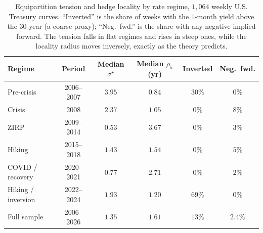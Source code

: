 \documentclass[]{interact}
\theoremstyle{plain}
\begin{document}
\begin{table}[h]\centering\small
\begin{tabular}{lccccc}
\hline
Regime & Period & Median $\sigma^\star$ & Median $\rho_5$ (yr) & Inverted & Neg.\ fwd.\\
\hline
Pre-crisis      & 2006--2007 & $3.95$ & $0.84$ & $30\%$ & $0\%$\\
Crisis          & 2008       & $2.37$ & $1.05$ & $0\%$  & $8\%$\\
ZIRP            & 2009--2014 & $0.53$ & $3.67$ & $0\%$  & $3\%$\\
Hiking          & 2015--2018 & $1.43$ & $1.54$ & $0\%$  & $5\%$\\
COVID / recovery& 2020--2021 & $0.77$ & $2.71$ & $0\%$  & $2\%$\\
Hiking / inversion & 2022--2024 & $1.93$ & $1.20$ & $69\%$ & $0\%$\\
\hline
Full sample     & 2006--2026 & $1.35$ & $1.61$ & $13\%$ & $2.4\%$\\
\hline
\end{tabular}
\caption{Equipartition tension and hedge locality by rate regime, $1{,}064$ weekly U.S. Treasury
curves. ``Inverted'' is the share of weeks with the $1$-month yield above the $30$-year (a coarse
proxy); ``Neg.\ fwd.'' is the share with any negative implied forward. The tension falls in flat
regimes and rises in steep ones, while the locality radius moves inversely, exactly as the theory
predicts.}\label{tab:history}
\end{table}
\end{document}
